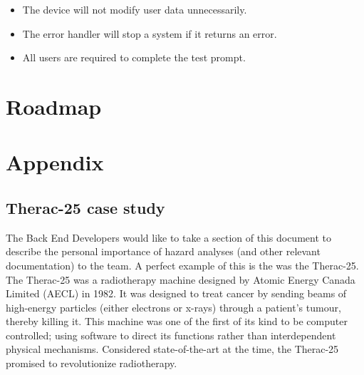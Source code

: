 \documentclass{article}
\begin{document}
\begin{itemize}
	\item The device will not modify user data unnecessarily.
	\item The error handler will stop a system if it returns an error.
\end{itemize}

\begin{itemize}[nosep, wide=0pt, leftmargin=*, after=\strut]
	\item All users are required to complete the test prompt.

\end{itemize}






\section{Roadmap}



\section*{Appendix}
\subsection*{Therac-25 case study}
The Back End Developers would like to take a section of this document to describe the personal importance of hazard analyses (and other relevant documentation) to the team. A perfect example of this is the was the Therac-25.\\

The Therac-25 was a radiotherapy machine designed by Atomic Energy Canada Limited (AECL) in 1982. It was designed to treat cancer by sending beams of high-energy particles (either electrons or x-rays) through a patient's tumour, thereby killing it. This machine was one of the first of its kind to be computer controlled; using software to direct its functions rather than interdependent physical mechanisms. \cite{leveson-1999} Considered state-of-the-art at the time, the Therac-25 promised to revolutionize radiotherapy.\\
\end{document}
